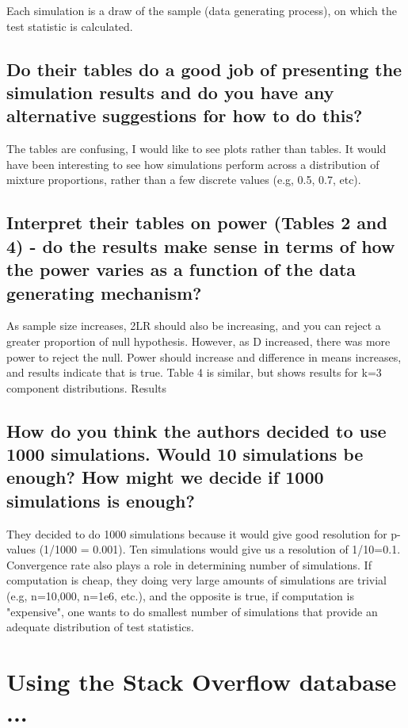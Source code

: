 \documentclass{article}\usepackage[]{graphicx}\usepackage[]{color}
\begin{document}
Each simulation is a draw of the sample (data generating process), on which the test statistic is calculated.

\subsection{Do their tables do a good job of presenting the simulation results and do you have any alternative suggestions for how to do this?}

The tables are confusing, I would like to see plots rather than tables. It would have been interesting to see how simulations perform across a distribution of mixture proportions, rather than a few discrete values (e.g, 0.5, 0.7, etc).

\subsection{Interpret their tables on power (Tables 2 and 4) - do the results make sense in terms of how the power varies as a function of the data generating mechanism?}

As sample size increases, 2LR should also be increasing, and you can reject a greater proportion of null hypothesis. However, as D increased, there was more power to reject the null. Power should increase and difference in means increases, and results indicate that is true. Table 4 is similar, but shows results for k=3 component distributions. Results 

\subsection{How do you think the authors decided to use 1000 simulations. Would 10 simulations be enough? How might we decide if 1000 simulations is enough?}

They decided to do 1000 simulations because it would give good resolution for p-values (1/1000 = 0.001). Ten simulations would give us a resolution of 1/10=0.1. Convergence rate also plays a role in determining number of simulations. If computation is cheap, they doing very large amounts of simulations are trivial (e.g, n=10,000, n=1e6, etc.), and the opposite is true, if computation is "expensive", one wants to do smallest number of simulations that provide an adequate distribution of test statistics. 



\section{Using the Stack Overflow database ...}
\end{document}
